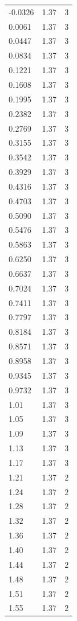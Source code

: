 \begin{longtable}{lrr}
  -0.0326 & 1.37 & 3 \\
  0.0061 & 1.37 & 3 \\
  0.0447 & 1.37 & 3 \\
  0.0834 & 1.37 & 3 \\
  0.1221 & 1.37 & 3 \\
  0.1608 & 1.37 & 3 \\
  0.1995 & 1.37 & 3 \\
  0.2382 & 1.37 & 3 \\
  0.2769 & 1.37 & 3 \\
  0.3155 & 1.37 & 3 \\
  0.3542 & 1.37 & 3 \\
  0.3929 & 1.37 & 3 \\
  0.4316 & 1.37 & 3 \\
  0.4703 & 1.37 & 3 \\
  0.5090 & 1.37 & 3 \\
  0.5476 & 1.37 & 3 \\
  0.5863 & 1.37 & 3 \\
  0.6250 & 1.37 & 3 \\
  0.6637 & 1.37 & 3 \\
  0.7024 & 1.37 & 3 \\
  0.7411 & 1.37 & 3 \\
  0.7797 & 1.37 & 3 \\
  0.8184 & 1.37 & 3 \\
  0.8571 & 1.37 & 3 \\
  0.8958 & 1.37 & 3 \\
  0.9345 & 1.37 & 3 \\
  0.9732 & 1.37 & 3 \\
  1.01 & 1.37 & 3 \\
  1.05 & 1.37 & 3 \\
  1.09 & 1.37 & 3 \\
  1.13 & 1.37 & 3 \\
  1.17 & 1.37 & 3 \\
  1.21 & 1.37 & 2 \\
  1.24 & 1.37 & 2 \\
  1.28 & 1.37 & 2 \\
  1.32 & 1.37 & 2 \\
  1.36 & 1.37 & 2 \\
  1.40 & 1.37 & 2 \\
  1.44 & 1.37 & 2 \\
  1.48 & 1.37 & 2 \\
  1.51 & 1.37 & 2 \\
  1.55 & 1.37 & 2 \\

\end{longtable}
